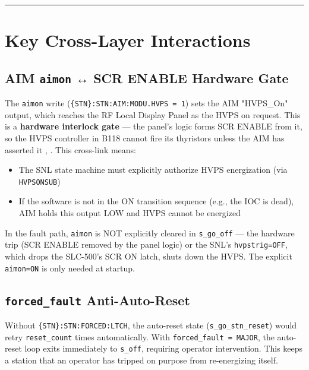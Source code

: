 \begin{center}\rule{0.5\linewidth}{0.5pt}\end{center}

\section{Key Cross-Layer Interactions}\label{sec:crosslayer}


\subsection{\texorpdfstring{AIM \texttt{aimon} ↔ SCR ENABLE Hardware Gate}{AIM aimon ↔ SCR ENABLE Hardware Gate}}\label{sec:xl-aimon}


The \texttt{aimon} write (\texttt{\{STN\}:\allowbreak{}STN:\allowbreak{}AIM:\allowbreak{}MODU.\allowbreak{}HVPS\ =\ 1}) sets the AIM "HVPS\_On" output, which reaches the RF Local Display Panel as the HVPS on request. This is a \textbf{hardware interlock gate} --- the panel's logic forms SCR ENABLE from it, so the HVPS controller in B118 cannot fire its thyristors unless the AIM has asserted it , . This cross-link means:

\begin{itemize}
\tightlist
\item
  The SNL state machine must explicitly authorize HVPS energization (via \texttt{HVPSONSUB})
\item
  If the software is not in the ON transition sequence (e.g., the IOC is dead), AIM holds this output LOW and HVPS cannot be energized
\end{itemize}

In the fault path, \texttt{aimon} is NOT explicitly cleared in \texttt{s\_go\_off} --- the hardware trip (SCR ENABLE removed by the panel logic) or the SNL's \texttt{hvpstrig=OFF}, which drops the SLC-500's SCR ON latch, shuts down the HVPS. The explicit \texttt{aimon=ON} is only needed at startup.

\subsection{\texorpdfstring{\texttt{forced\_fault} Anti-Auto-Reset}{forced\_fault Anti-Auto-Reset}}\label{sec:xl-forced-fault}


Without \texttt{\{STN\}:\allowbreak{}STN:\allowbreak{}FORCED:\allowbreak{}LTCH}, the auto-reset state (\texttt{s\_\allowbreak{}go\_\allowbreak{}stn\_\allowbreak{}reset}) would retry \texttt{reset\_count} times automatically. With \texttt{forced\_\allowbreak{}fault\ =\ MAJOR}, the auto-reset loop exits immediately to \texttt{s\_off}, requiring operator intervention. This keeps a station that an operator has tripped on purpose from re-energizing itself.

